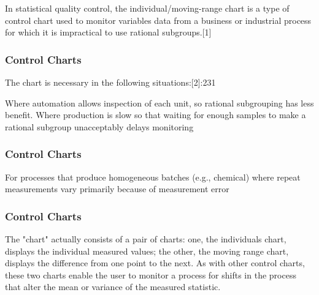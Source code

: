 \begin{frame}

In statistical quality control, the individual/moving-range chart is a type of control chart 
used to monitor variables data from a business or industrial process for which it is impractical 
to use rational subgroups.[1]

\end{frame}
\begin{frame}
\frametitle{Control Charts}
The chart is necessary in the following situations:[2]:231

Where automation allows inspection of each unit, so rational subgrouping has less benefit.
Where production is slow so that waiting for enough samples to make a rational subgroup
unacceptably delays monitoring
\end{frame}
\begin{frame}
\frametitle{Control Charts}
For processes that produce homogeneous batches (e.g., chemical) where repeat measurements vary primarily 
because of measurement error
\end{frame}
\begin{frame}
\frametitle{Control Charts}
The "chart" actually consists of a pair of charts: one, the individuals chart, displays the individual measured values; 
the other, the moving range chart, displays the difference from one point to the next. 
As with other control charts, these two charts enable the user to monitor a process for shifts in the process that 
alter the mean or variance of the measured statistic.
\end{frame}
